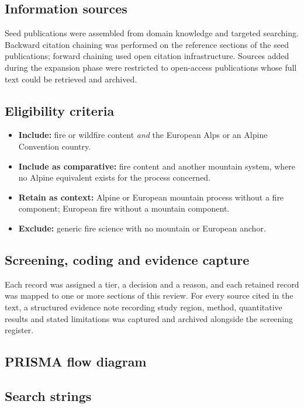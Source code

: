 \documentclass[11pt,a4paper]{article}
\begin{document}
\subsection{Information sources}

Seed publications were assembled from domain knowledge and targeted searching. Backward citation chaining was performed on the reference sections of the seed publications; forward chaining used open citation infrastructure. Sources added during the expansion phase were restricted to open-access publications whose full text could be retrieved and archived.

\subsection{Eligibility criteria}

\begin{itemize}
    \item \textbf{Include:} fire or wildfire content \emph{and} the European Alps or an Alpine Convention country.
    \item \textbf{Include as comparative:} fire content and another mountain system, where no Alpine equivalent exists for the process concerned.
    \item \textbf{Retain as context:} Alpine or European mountain process without a fire component; European fire without a mountain component.
    \item \textbf{Exclude:} generic fire science with no mountain or European anchor.
\end{itemize}

\subsection{Screening, coding and evidence capture}

Each record was assigned a tier, a decision and a reason, and each retained record was mapped to one or more sections of this review. For every source cited in the text, a structured evidence note recording study region, method, quantitative results and stated limitations was captured and archived alongside the screening register.

\subsection{PRISMA flow diagram}

\subsection{Search strings}
\end{document}
